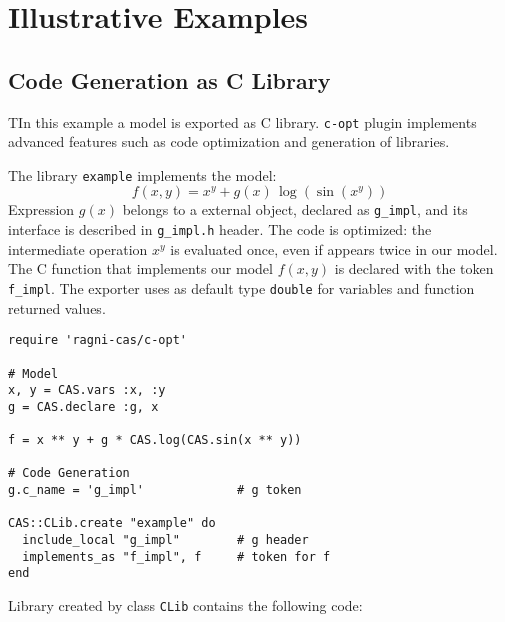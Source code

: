 
\section{Illustrative Examples}
\label{sec:examples}

\subsection{Code Generation as C Library}
TIn this example a model is exported as C library. \texttt{c-opt} plugin implements advanced features such as code optimization and generation of libraries.

The library \texttt{example} implements the model:
\begin{equation}
f(x, y) = x^y + g(x)\, \log(\sin(x^y))
\end{equation}
Expression $g(x)$ belongs to a external object, declared as \texttt{g\_impl}, and its interface is described in \texttt{g\_impl.h} header. The code is optimized: the intermediate operation $x^y$ is evaluated once, even if appears twice in our model. The C function that implements our model $f(x,y)$ is declared with the token \texttt{f\_impl}. The exporter uses as default type \texttt{double} for variables and function returned values.

\begin{lstlisting}[caption={Calling optimized-C exporter for library generation},label={code:example-exporting-C-1}]
require 'ragni-cas/c-opt'

# Model
x, y = CAS.vars :x, :y
g = CAS.declare :g, x

f = x ** y + g * CAS.log(CAS.sin(x ** y))

# Code Generation
g.c_name = 'g_impl'             # g token

CAS::CLib.create "example" do
  include_local "g_impl"        # g header
  implements_as "f_impl", f     # token for f
end
\end{lstlisting}
Library created by class \texttt{CLib} contains the following code:

\noindent%
  \begin{minipage}{.5\textwidth}
    
  \end{minipage}\hfill
  \begin{minipage}{.5\textwidth}
    
  \end{minipage}

